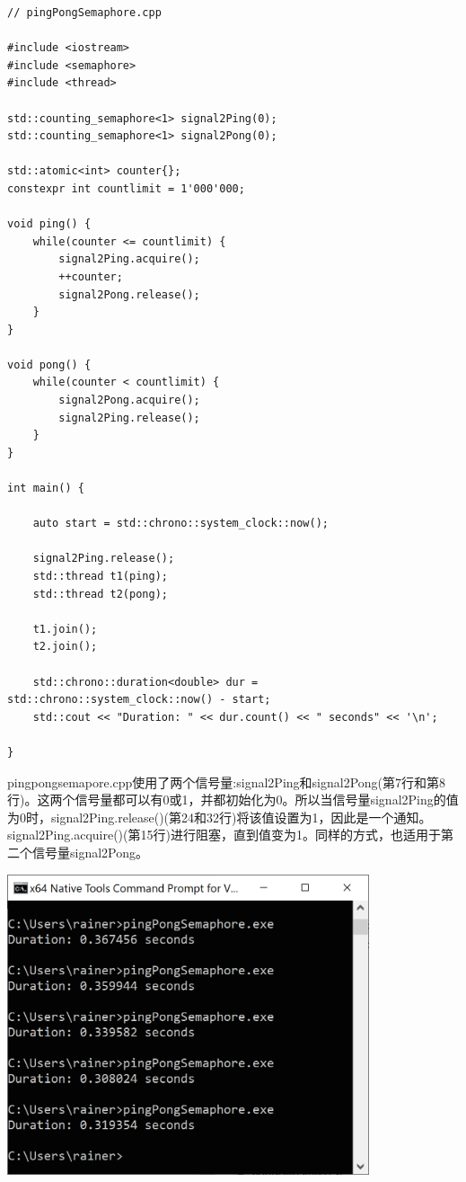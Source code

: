 \begin{lstlisting}[style=styleCXX]
// pingPongSemaphore.cpp

#include <iostream>
#include <semaphore>
#include <thread>

std::counting_semaphore<1> signal2Ping(0);
std::counting_semaphore<1> signal2Pong(0);

std::atomic<int> counter{};
constexpr int countlimit = 1'000'000;

void ping() {
	while(counter <= countlimit) {
		signal2Ping.acquire();
		++counter;
		signal2Pong.release();
	}
}

void pong() {
	while(counter < countlimit) {
		signal2Pong.acquire();
		signal2Ping.release();
	}
}

int main() {

	auto start = std::chrono::system_clock::now();
	
	signal2Ping.release();
	std::thread t1(ping);
	std::thread t2(pong);
	
	t1.join();
	t2.join();
	
	std::chrono::duration<double> dur = std::chrono::system_clock::now() - start;
	std::cout << "Duration: " << dur.count() << " seconds" << '\n';

}
\end{lstlisting}

pingpongsemapore.cpp使用了两个信号量:signal2Ping和signal2Pong(第7行和第8行)。这两个信号量都可以有0或1，并都初始化为0。所以当信号量signal2Ping的值为0时，signal2Ping.release()(第24和32行)将该值设置为1，因此是一个通知。signal2Ping.acquire()(第15行)进行阻塞，直到值变为1。同样的方式，也适用于第二个信号量signal2Pong。

\begin{center}
\includegraphics[width=0.8\textwidth]{content/3/chapter7/images/6.png}\\
\end{center}

